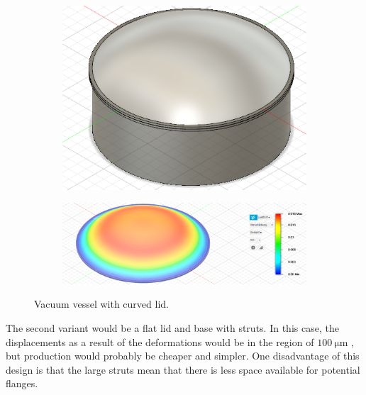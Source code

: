 \begin{figure}[H]
    \centering
    \begin{subfigure}[b]{0.3\textwidth}
        \centering
        \includegraphics[width=1\textwidth]{sections/imges/vacuum_vessel/Kekskochtopf.PNG}
        \subcaption{}
        \label{fig:Kekskochtopf}
    \end{subfigure}
    \hfil
    \begin{subfigure}[b]{0.59\textwidth}
        \centering
        \includegraphics[width=1\textwidth]{sections/imges/vacuum_vessel/Kekskochtopf_Simu.PNG}
        \label{fig:Kekskochtopf_FEM}
    \end{subfigure}
    \caption{Vacuum vessel with curved lid.}
    \label{fig:Kekskochtopf_all}
\end{figure}

The second variant would be a flat lid and base with struts.
In this case, the displacements as a result of the deformations would be in the region of $100\ \si{\micro\meter}$ , but production would probably be cheaper and simpler.
One disadvantage of this design is that the large struts mean that there is less space available for potential flanges.

